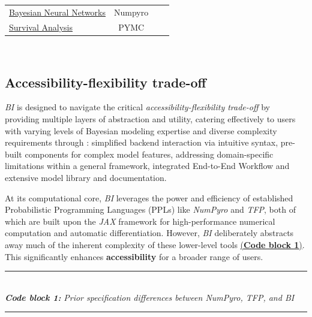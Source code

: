 \documentclass[blind,lineno,num-refs]{wiley-article}
\begin{document}
\begin{table}[bt]
\begin{threeparttable}
\begin{tabular}{lccc}
\href{https://tinyurl.com/yc7tp6j6}{Bayesian Neural Networks}
& Numpyro \citep{phan2019composable} \\

\href{https://tinyurl.com/vpd38745}{Survival Analysis}
& PYMC \citep{abril2023pymc} \\


\hline %
\end{tabular}

\begin{tablenotes}
\item ~
\end{tablenotes}
\end{threeparttable}
\end{table}

\subsection{Accessibility-flexibility trade-off}\label{Accessibility-flexibility trade-off}
\textit{BI} is designed to navigate the critical \textit{accessibility-flexibility trade-off} by providing multiple layers of abstraction and utility, catering effectively to users with varying levels of Bayesian modeling expertise and diverse complexity requirements through : simplified backend interaction via intuitive syntax, pre-built components for complex model features, addressing domain-specific limitations within a general framework, integrated End-to-End Workflow and extensive model library and documentation.

At its computational core, \textit{BI} leverages the power and efficiency of established Probabilistic Programming Languages (PPLs) like \textit{NumPyro} and \textit{TFP}, both of which are built upon the \textit{JAX} framework for high-performance numerical computation and automatic differentiation. However, \textit{BI} deliberately abstracts away much of the inherent complexity of these lower-level tools \hyperref[code:block1_example]{(\textbf{Code block 1})}. This significantly enhances \textbf{accessibility} for a broader range of users.

\label{code:block1_example} 
\noindent\rule{\linewidth}{0.4pt}\\[0pt] %
\noindent\textbf{\textit{Code block 1: }} \textit{Prior specification differences between NumPyro, TFP, and BI}\\[-10pt]
\noindent\rule{\linewidth}{0.4pt}\\[-8pt] %
\vspace{-\parskip}\vspace{0pt}
\end{document}
